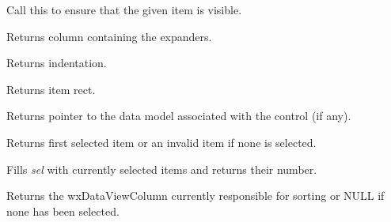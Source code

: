 
Call this to ensure that the given item is visible.

\label{wxdataviewctrlgetexpandercolumn}


Returns column containing the expanders.

\label{wxdataviewctrlgetindent}


Returns indentation.

\label{wxdataviewctrlgetitemrect}


Returns item rect.

\label{wxdataviewctrlgetmodel}


Returns pointer to the data model associated with the
control (if any).

\label{wxdataviewctrlgetselection}


Returns first selected item or an invalid item if none is selected.

\label{wxdataviewctrlgetselections}


Fills {\it sel} with currently selected items and returns
their number.

\label{wxdataviewctrlgetsortingcolumn}


Returns the wxDataViewColumn currently responsible for sorting
or NULL if none has been selected.

\label{wxdataviewctrlhittest}

